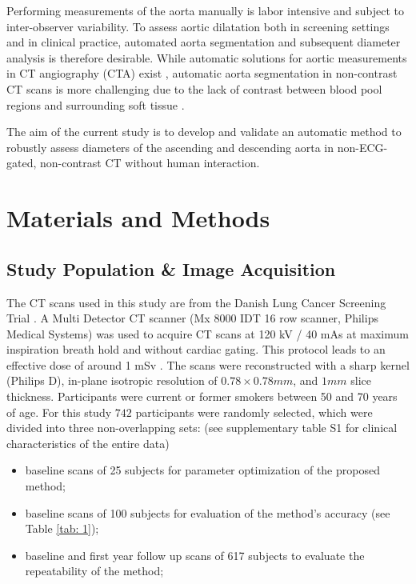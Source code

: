 Performing measurements of the aorta manually is labor intensive and subject to inter-observer variability. To assess aortic dilatation both in screening settings and in clinical practice, automated aorta segmentation and subsequent diameter analysis is therefore desirable. While automatic solutions for aortic measurements in CT angiography (CTA) exist \autocite{gao2017quantification, entezari2013analysis, elattar2014automatic, ecabert2011segmentation, biesdorf2012segmentation}, automatic aorta segmentation in non-contrast CT scans is more challenging due to the lack of contrast between blood pool regions and surrounding soft tissue \autocite{kitasaka2002automated, avila2013segmentation, kurugol2015automated, isgum2009multi, xie2014automated}.


The aim of the current study is to develop and validate an automatic method to robustly assess diameters of the ascending and descending aorta in non-ECG-gated, non-contrast CT without human interaction.


\section{Materials and Methods}

\subsection{Study Population \& Image Acquisition}
The CT scans used in this study are from the Danish Lung Cancer Screening Trial \autocite{pedersen2009danish}. A Multi Detector CT scanner (Mx 8000 IDT 16 row scanner, Philips Medical Systems) was used to acquire CT scans at 120 kV / 40 mAs at maximum inspiration breath hold and without cardiac gating. This protocol leads to an effective dose of around 1 mSv \autocite{wille2016results}. The scans were reconstructed with a sharp kernel (Philips D), in-plane isotropic resolution of $0.78 \times 0.78 mm$, and $1 mm$ slice thickness. Participants were current or former smokers between 50 and 70 years of age. For this study $742$ participants were randomly selected, which were divided into three non-overlapping sets: (see supplementary table S1 for clinical characteristics of the entire data)
\begin{itemize}
\item baseline scans of 25 subjects for parameter optimization of the proposed method;
\item baseline scans of 100 subjects for evaluation of the method’s accuracy (see Table \cref{tab: 1}); 
\item baseline and first year follow up scans of 617 subjects to evaluate the repeatability of the method;
\end{itemize}
    
